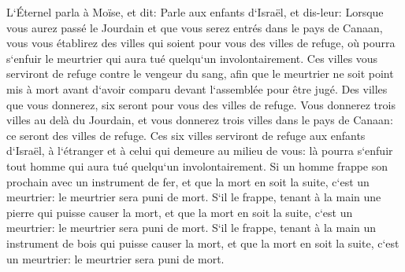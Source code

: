 \verse L`Éternel parla à Moïse, et dit: 
\verse Parle aux enfants d`Israël, et dis-leur: Lorsque vous aurez passé le Jourdain et que vous serez entrés dans le pays de Canaan, 
\verse vous vous établirez des villes qui soient pour vous des villes de refuge, où pourra s`enfuir le meurtrier qui aura tué quelqu`un involontairement. 
\verse Ces villes vous serviront de refuge contre le vengeur du sang, afin que le meurtrier ne soit point mis à mort avant d`avoir comparu devant l`assemblée pour être jugé. 
\verse Des villes que vous donnerez, six seront pour vous des villes de refuge. 
\verse Vous donnerez trois villes au delà du Jourdain, et vous donnerez trois villes dans le pays de Canaan: ce seront des villes de refuge. 
\verse Ces six villes serviront de refuge aux enfants d`Israël, à l`étranger et à celui qui demeure au milieu de vous: là pourra s`enfuir tout homme qui aura tué quelqu`un involontairement. 
\verse Si un homme frappe son prochain avec un instrument de fer, et que la mort en soit la suite, c`est un meurtrier: le meurtrier sera puni de mort. 
\verse S`il le frappe, tenant à la main une pierre qui puisse causer la mort, et que la mort en soit la suite, c`est un meurtrier: le meurtrier sera puni de mort. 
\verse S`il le frappe, tenant à la main un instrument de bois qui puisse causer la mort, et que la mort en soit la suite, c`est un meurtrier: le meurtrier sera puni de mort. 
